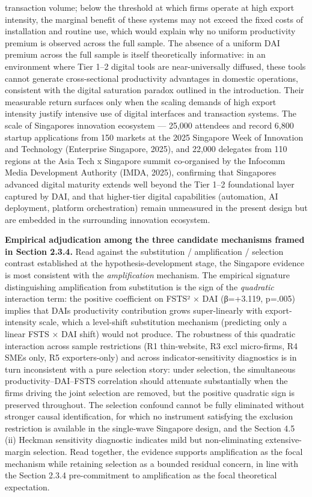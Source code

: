 \documentclass[12pt,a4paper]{article}
\begin{document}
transaction volume; below the threshold at which firms operate at high
export intensity, the marginal benefit of these systems may not exceed
the fixed costs of installation and routine use, which would explain why
no uniform productivity premium is observed across the full sample. The
absence of a uniform DAI premium across the full sample is itself
theoretically informative: in an environment where Tier 1--2 digital
tools are near-universally diffused, these tools cannot generate
cross-sectional productivity advantages in domestic operations,
consistent with the digital saturation paradox outlined in the
introduction. Their measurable return surfaces only when the scaling
demands of high export intensity justify intensive use of digital
interfaces and transaction systems. The scale of
Singapore\textquotesingle s innovation ecosystem --- 25,000 attendees
and record 6,800 startup applications from 150 markets at the 2025
Singapore Week of Innovation and Technology (Enterprise Singapore,
2025), and 22,000 delegates from 110 regions at the Asia Tech x
Singapore summit co-organised by the Infocomm Media Development
Authority (IMDA, 2025), confirming that Singapore\textquotesingle s
advanced digital maturity extends well beyond the Tier 1--2 foundational
layer captured by DAI, and that higher-tier digital capabilities
(automation, AI deployment, platform orchestration) remain unmeasured in
the present design but are embedded in the surrounding innovation
ecosystem.

\textbf{Empirical adjudication among the three candidate mechanisms
framed in Section 2.3.4.} Read against the substitution / amplification
/ selection contrast established at the hypothesis-development stage,
the Singapore evidence is most consistent with the \emph{amplification}
mechanism. The empirical signature distinguishing amplification from
substitution is the sign of the \emph{quadratic} interaction term: the
positive coefficient on FSTS² × DAI (β=+3.119, p=.005) implies that
DAI\textquotesingle s productivity contribution grows super-linearly
with export-intensity scale, which a level-shift substitution mechanism
(predicting only a linear FSTS × DAI shift) would not produce. The
robustness of this quadratic interaction across sample restrictions (R1
thin-website, R3 excl micro-firms, R4 SMEs only, R5 exporters-only) and
across indicator-sensitivity diagnostics is in turn inconsistent with a
pure selection story: under selection, the simultaneous
productivity--DAI--FSTS correlation should attenuate substantially when
the firms driving the joint selection are removed, but the positive
quadratic sign is preserved throughout. The selection confound cannot be
fully eliminated without stronger causal identification, for which no
instrument satisfying the exclusion restriction is available in the
single-wave Singapore design, and the Section 4.5 (ii) Heckman
sensitivity diagnostic indicates mild but non-eliminating
extensive-margin selection. Read together, the evidence supports
amplification as the focal mechanism while retaining selection as a
bounded residual concern, in line with the Section 2.3.4 pre-commitment
to amplification as the focal theoretical expectation.
\end{document}
